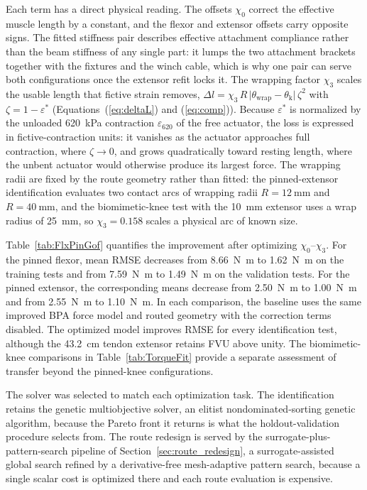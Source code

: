 \documentclass[utf8]{FrontiersinHarvard} %
\providecommand{\abs}[1]{\lvert#1\rvert}
\begin{document}
Each term has a direct physical reading. The offsets $\chi_{0}$ correct the effective muscle length by a constant, and the flexor and extensor offsets carry opposite signs. The fitted stiffness pair describes effective attachment compliance rather than the beam stiffness of any single part: it lumps the two attachment brackets together with the fixtures and the winch cable, which is why one pair can serve both configurations once the extensor refit locks it. The wrapping factor $\chi_{3}$ scales the usable length that fictive strain removes, $\Delta l = \chi_{3}\, R\, \abs{\theta_{\text{wrap}} - \theta_{\text{k}}}\, \zeta^{2}$ with $\zeta = 1 - \varepsilon^{*}$ (Equations~(\ref{eq:deltaL}) and (\ref{eq:comp})). Because $\varepsilon^{*}$ is normalized by the unloaded \qty{620}{\kPa} contraction $\varepsilon_{620}$ of the free actuator, the loss is expressed in fictive-contraction units: it vanishes as the actuator approaches full contraction, where $\zeta \to 0$, and grows quadratically toward resting length, where the unbent actuator would otherwise produce its largest force. The wrapping radii are fixed by the route geometry rather than fitted: the pinned-extensor identification evaluates two contact arcs of wrapping radii $R = \qty{12}{\mm}$ and $R = \qty{40}{\mm}$, and the biomimetic-knee test with the \qty{10}{\mm} extensor uses a wrap radius of \qty{25}{\mm}, so $\chi_{3} = 0.158$ scales a physical arc of known size.

Table~\ref{tab:FlxPinGof} quantifies the improvement after optimizing $\chi_0$--$\chi_3$. For the pinned flexor, mean RMSE decreases from \qty{8.66}{\newton\meter} to \qty{1.62}{\newton\meter} on the training tests and from \qty{7.59}{\newton\meter} to \qty{1.49}{\newton\meter} on the validation tests. For the pinned extensor, the corresponding means decrease from \qty{2.50}{\newton\meter} to \qty{1.00}{\newton\meter} and from \qty{2.55}{\newton\meter} to \qty{1.10}{\newton\meter}. In each comparison, the baseline uses the same improved BPA force model and routed geometry with the correction terms disabled. The optimized model improves RMSE for every identification test, although the \qty{43.2}{\cm} tendon extensor retains FVU above unity. The biomimetic-knee comparisons in Table~\ref{tab:TorqueFit} provide a separate assessment of transfer beyond the pinned-knee configurations.

The solver was selected to match each optimization task. The identification retains the genetic multiobjective solver, an elitist nondominated-sorting genetic algorithm, because the Pareto front it returns is what the holdout-validation procedure selects from. The route redesign is served by the surrogate-plus-pattern-search pipeline of Section~\ref{sec:route_redesign}, a surrogate-assisted global search refined by a derivative-free mesh-adaptive pattern search, because a single scalar cost is optimized there and each route evaluation is expensive.
\end{document}
